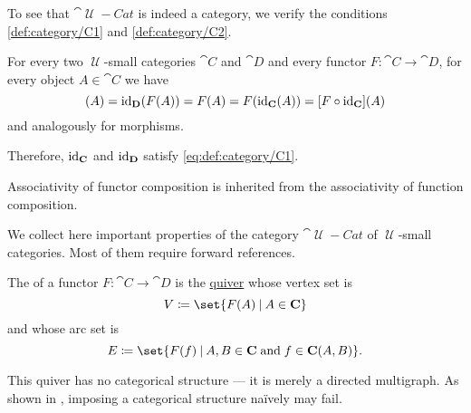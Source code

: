 \begin{defproof}
  To see that \( \cat{\mscrU-Cat} \) is indeed a category, we verify the conditions \ref{def:category/C1} and \ref{def:category/C2}.

   For every two \( \mscrU \)-small categories \( \cat{C} \) and \( \cat{D} \) and every functor \( F: \cat{C} \to \cat{D} \), for every object \( A \in \cat{C} \) we have
  \begin{equation*}
    [\id_{\cat{D}} \bincirc F](A)
    =
    \id_{\cat{D}}(F(A))
    =
    F(A)
    =
    F(\id_{\cat{C}}(A))
    =
    [F \bincirc \id_{\cat{C}}](A)
  \end{equation*}
  and analogously for morphisms.

  Therefore, \( \operatorname{id}_{\operatorname{\mathbf{C}}} \) and \( \operatorname{id}_{\operatorname{\mathbf{D}}} \) satisfy \eqref{eq:def:category/C1}.

   Associativity of functor composition is inherited from the associativity of function composition.
\end{defproof}

\begin{proposition}\label{thm:category_of_small_categories_properites}
  We collect here important properties of the category \hyperref[def:category_of_small_categories]{\( \cat{\mscrU-Cat} \)} of \( \mscrU \)-small categories. Most of them require forward references.
\end{proposition}

\begin{definition}\label{def:functor_image}
  The  of a functor \( F: \cat{C} \to \cat{D} \) is the \hyperref[def:quiver]{quiver} whose vertex set is
  \begin{equation*}
    V \coloneqq \set{ F(A) \given A \in \cat{C} }
  \end{equation*}
  and whose arc set is
  \begin{equation*}
    E \coloneqq \set{ F(f) \given A, B \in \cat{C} \T{and} f \in \cat{C}(A, B) }.
  \end{equation*}

  This quiver has no categorical structure --- it is merely a directed multigraph. As shown in , imposing a categorical structure na\"ively may fail.
\end{definition}

